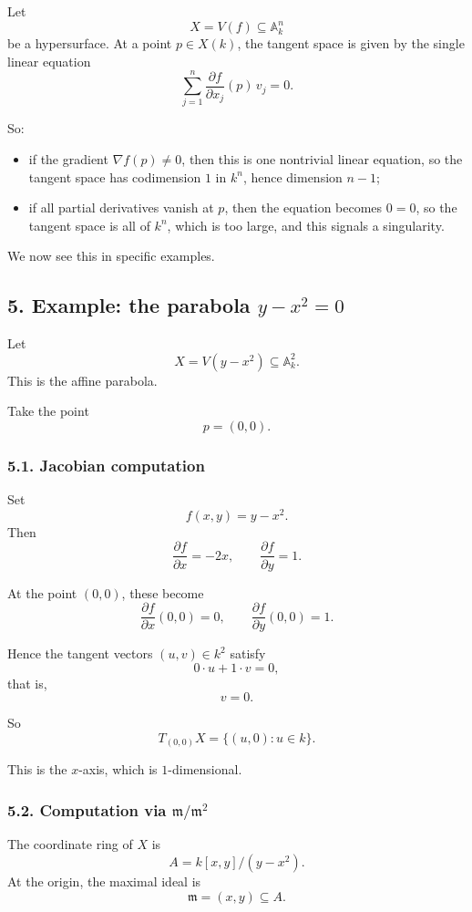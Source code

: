 \documentclass[12pt,a4paper]{article}
\theoremstyle{plain}
\theoremstyle{definition}      %
\begin{document}
	Let
	\[
	X=V(f)\subseteq \mathbb A_k^n
	\]
	be a hypersurface. At a point \(p\in X(k)\), the tangent space is given by the single linear equation
	\[
	\sum_{j=1}^n \frac{\partial f}{\partial x_j}(p)\,v_j=0.
	\]
	
	So:
	
	\begin{itemize}
		\item if the gradient \(\nabla f(p)\neq 0\), then this is one nontrivial linear equation, so the tangent space has codimension \(1\) in \(k^n\), hence dimension \(n-1\);
		\item if all partial derivatives vanish at \(p\), then the equation becomes \(0=0\), so the tangent space is all of \(k^n\), which is too large, and this signals a singularity.
	\end{itemize}
	
	We now see this in specific examples.
	
	\subsection*{5. Example: the parabola \(y-x^2=0\)}
	
	Let
	\[
	X=V(y-x^2)\subseteq \mathbb A_k^2.
	\]
	This is the affine parabola.
	
	Take the point
	\[
	p=(0,0).
	\]
	
	\subsubsection*{5.1. Jacobian computation}
	
	Set
	\[
	f(x,y)=y-x^2.
	\]
	Then
	\[
	\frac{\partial f}{\partial x}=-2x,
	\qquad
	\frac{\partial f}{\partial y}=1.
	\]
	
	At the point \((0,0)\), these become
	\[
	\frac{\partial f}{\partial x}(0,0)=0,
	\qquad
	\frac{\partial f}{\partial y}(0,0)=1.
	\]
	
	Hence the tangent vectors \((u,v)\in k^2\) satisfy
	\[
	0\cdot u+1\cdot v=0,
	\]
	that is,
	\[
	v=0.
	\]
	
	So
	\[
	T_{(0,0)}X=\{(u,0):u\in k\}.
	\]
	
	This is the \(x\)-axis, which is \(1\)-dimensional.
	
	\subsubsection*{5.2. Computation via \(\mathfrak m/\mathfrak m^2\)}
	
	The coordinate ring of \(X\) is
	\[
	A=k[x,y]/(y-x^2).
	\]
	At the origin, the maximal ideal is
	\[
	\mathfrak m=(x,y)\subseteq A.
	\]
	
\end{document}
